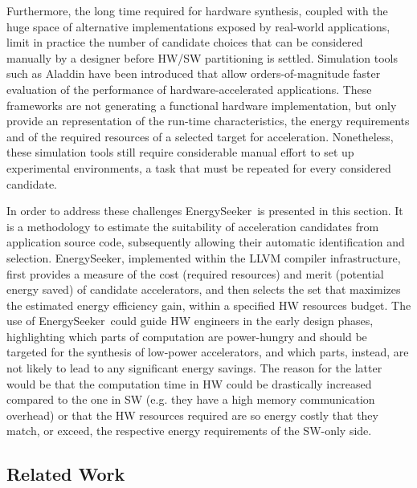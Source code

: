 \documentclass[]{usiinfthesis}
\newcommand{\eseeker}{{EnergySeeker}}
\begin{document}
Furthermore, the long time required for hardware
synthesis, coupled with the huge space of alternative implementations
exposed by real-world applications, limit in practice the number of
candidate choices that can be considered manually by a designer
before HW/SW partitioning is settled.
Simulation tools such as Aladdin \cite{ShaoJul14} have been
introduced that allow orders-of-magnitude faster evaluation of the
performance of hardware-accelerated applications. These frameworks are
not generating a functional hardware implementation, but
only provide an representation of the run-time
characteristics, the energy requirements and of the required resources of a 
selected target for
acceleration. Nonetheless, these simulation tools still require considerable
manual effort to set up experimental environments, a task that must be
repeated for every considered candidate.\par

In order to address these challenges \eseeker\ is presented in this section. 
It is a methodology to
estimate the suitability of acceleration candidates from application
source code, subsequently allowing their automatic identification and
selection. \eseeker, implemented within the LLVM
\cite{LattnerMar04} compiler infrastructure, first provides a measure
of the cost (required resources) and merit (potential energy saved)
of candidate accelerators, and then selects the set that maximizes 
the estimated energy efficiency gain, within a specified HW resources 
budget. The use of \eseeker\ could guide HW engineers in the early design phases,
highlighting which parts of computation are power-hungry and
should be targeted for the synthesis of low-power accelerators, and which parts,
instead, are not likely to lead to any significant energy savings. The reason for
the latter would be that the computation time in HW could be drastically increased
compared to the one in SW (e.g. they have a high memory communication overhead) or
that the HW resources required are so energy costly that they match, or exceed, the 
respective energy requirements of the SW-only side.

\subsection{Related Work}
\end{document}
